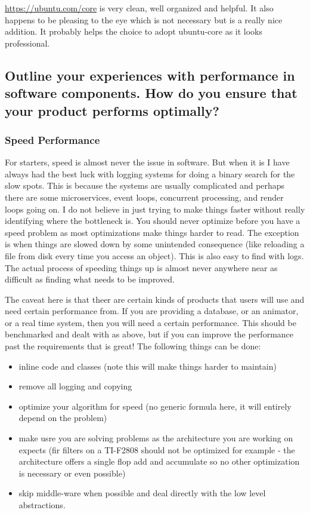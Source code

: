 \documentclass[letter,12pt]{article}
\begin{document}
\href{https://ubuntu.com/core}{https://ubuntu.com/core} is very clean, well organized and helpful. It also happens to be pleasing to the eye which is not necessary but is a really nice addition. It probably helps the choice to adopt ubuntu-core as it looks professional.


\subsection{Outline your experiences with performance in software components. How do you ensure that your product performs optimally?}
\subsubsection{Speed Performance}
For starters, speed is almost never the issue in software. But when it is I have always had the best luck with logging systems for doing a binary search for the slow spots. This is because the systems are usually complicated and perhaps there are some microservices, event loops, concurrent processing, and render loops going on. I do not believe in just trying to make things faster without really identifying where the bottleneck is. You should never optimize before you have a speed problem as most optimizations make things harder to read. The exception is when things are slowed down by some unintended consequence (like reloading a file from disk every time you access an object). This is also easy to find with logs. The actual process of speeding things up is almost never anywhere near as difficult as finding what needs to be improved.

The caveat here is that theer are certain kinds of products that users will use and need certain performance from. If you are providing a database, or an animator, or a real time system, then you will need a certain performance. This should be benchmarked and dealt with as above, but if you can improve the performance past the requirements that is great! The following things can be done:
\begin{itemize}
\item inline code and classes (note this will make things harder to maintain)
\item remove all logging and copying
\item optimize your algorithm for speed (no generic formula here, it will entirely depend on the problem)
\item make usre you are solving problems as the architecture you are working on expects (fir filters on a TI-F2808 should not be optimized for example - the architecture offers a single flop add and accumulate so no other optimization is necessary or even possible)
\item skip middle-ware when possible and deal directly with the low level abstractions.
\end{itemize}
\end{document}
